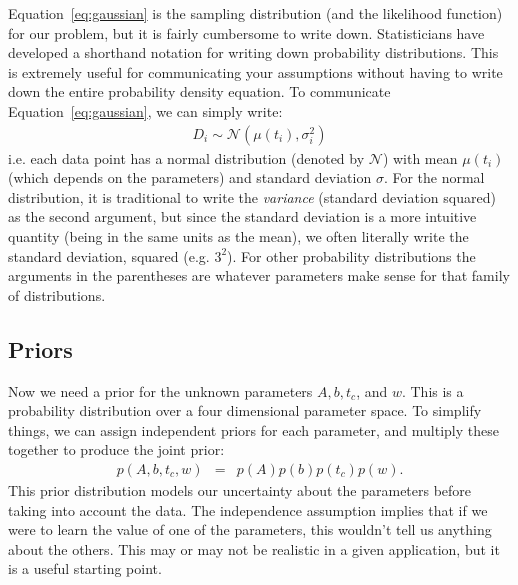 Equation~\ref{eq:gaussian} is the sampling distribution
(and the likelihood function) for our problem, but it
is fairly cumbersome to write down. Statisticians have developed a shorthand
notation for writing down probability distributions. This is extremely useful
for communicating your assumptions without having to write down
the entire probability density equation. To communicate
Equation~\ref{eq:gaussian}, we can simply write:
\begin{eqnarray}
D_i \sim \mathcal{N}\left(\mu(t_i), \sigma_i^2\right)
\end{eqnarray}
i.e. each data point has a normal distribution (denoted by $\mathcal{N}$)
with mean $\mu(t_i)$ (which
depends on the parameters) and standard deviation $\sigma$. For the normal
distribution, it is traditional to write the {\it variance} (standard deviation
squared) as the second argument, but since the standard deviation is a more
intuitive quantity (being in the same units as the mean), we often literally
write the standard deviation, squared (e.g. $3^2$). For other probability
distributions the arguments in the parentheses are whatever parameters make
sense for that family of distributions.

\subsection{Priors}
Now we need a prior for the unknown parameters $A, b, t_c$, and $w$. This is
a probability distribution over a four dimensional parameter space. To simplify things, we can
assign independent priors for each parameter, and multiply these together
to produce the joint prior:
\begin{eqnarray}
p(A, b, t_c, w) &=& p(A)p(b)p(t_c)p(w).
\end{eqnarray}
This prior distribution models our uncertainty about the parameters before
taking into account the data. The independence assumption implies that if we
were to learn the value of one of the parameters, this wouldn't tell us anything
about the others. This may or may not be realistic in a given application, but
it is a useful starting point.


